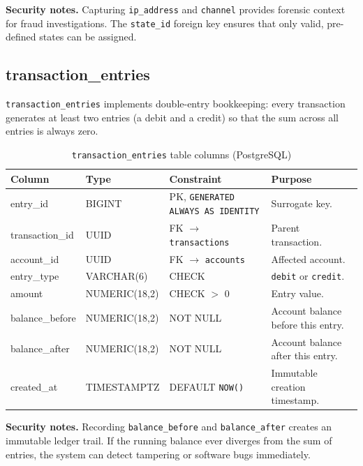 \noindent\textbf{Security notes.}
Capturing \texttt{ip\_address} and \texttt{channel} provides forensic context for fraud investigations. The \texttt{state\_id} foreign key ensures that only valid, pre-defined states can be assigned.

\subsection{transaction\_entries}
\label{sec:tbl-txentries}

\texttt{transaction\_entries} implements double-entry bookkeeping: every transaction generates at least two entries (a debit and a credit) so that the sum across all entries is always zero.

\begin{table}[htbp]
  \centering
  \caption{\texttt{transaction\_entries} table columns (PostgreSQL)}
  \label{tab:txentries}
  \small
  \setlength{\tabcolsep}{4pt}
  \renewcommand{\arraystretch}{1.15}
  \begin{tabularx}{\textwidth}{@{} l l l X @{}}
    \toprule
    \textbf{Column} & \textbf{Type} & \textbf{Constraint} & \textbf{Purpose} \\
    \midrule
    entry\_id        & BIGINT          & PK, \texttt{GENERATED ALWAYS AS IDENTITY} & Surrogate key. \\
    transaction\_id  & UUID            & FK $\to$ \texttt{transactions}  & Parent transaction. \\
    account\_id      & UUID            & FK $\to$ \texttt{accounts}      & Affected account. \\
    entry\_type      & VARCHAR(6)      & CHECK                  & \texttt{debit} or \texttt{credit}. \\
    amount           & NUMERIC(18,2)   & CHECK $>$ 0            & Entry value. \\
    balance\_before  & NUMERIC(18,2)   & NOT NULL               & Account balance before this entry. \\
    balance\_after   & NUMERIC(18,2)   & NOT NULL               & Account balance after this entry. \\
    created\_at      & TIMESTAMPTZ     & DEFAULT \texttt{NOW()} & Immutable creation timestamp. \\
    \bottomrule
  \end{tabularx}
\end{table}

\noindent\textbf{Security notes.}
Recording \texttt{balance\_before} and \texttt{balance\_after} creates an immutable ledger trail. If the running balance ever diverges from the sum of entries, the system can detect tampering or software bugs immediately.

